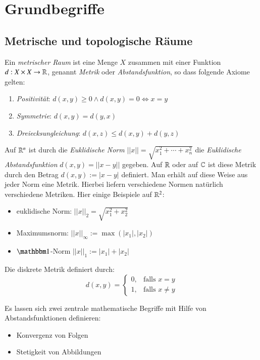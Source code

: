 \documentclass[a4paper,10pt]{scrartcl}
\renewcommand{\equiv}{\Longleftrightarrow}
\begin{document}
\section{Grundbegriffe}
\subsection{Metrische und topologische Räume}
\begin{df}
Ein \emph{metrischer Raum} ist eine Menge $X$ zusammen mit einer Funktion $d: X \times X \rightarrow \mathbb{R}$, genannt \emph{Metrik} oder \emph{Abstandsfunktion}, so dass folgende Axiome gelten:
\begin{enumerate}
\item \emph{Positivität}: $d(x,y)\ge 0 \land d(x,y)=0\equiv x=y$
\item \emph{Symmetrie}: $d(x,y)=d(y,x)$
\item \emph{Dreiecksungleichung}: $d(x,z) \le d(x,y)+d(y,z)$
\end{enumerate}
\end{df}
\begin{ex*}
Auf $\mathbb{R}^n$ ist durch die \emph{Euklidische Norm} $||x||=\sqrt{x_1^2+\dotsb +x_n^2}$ die \emph{Euklidische Abstandsfunktion} $d(x,y)=||x-y||$ gegeben. Auf $\mathbb{R}$ oder auf $\mathbb{C}$ ist diese Metrik durch den Betrag $d(x,y):=|x-y|$ definiert.  Man erhält auf diese Weise aus jeder Norm eine Metrik. Hierbei liefern verschiedene Normen natürlich verschiedene Metriken. Hier einige Beispiele auf $\mathbb{R}^2$:
\begin{itemize} 
\item euklidische Norm: $||x||_2=\sqrt{x_1^2+x_2^2}$
\item Maximumsnorm: $||x||_\infty := \max(|x_1|, |x_2|)$
\item $\Eins$-Norm $||x||_1 := |x_1|+|x_2|$
\end{itemize}
\end{ex*}

\begin{ex*}
Die diskrete Metrik definiert durch:
\[
d(x,y)=\begin{cases}
  0, & \text{falls } x=y \\ 1, & \text{falls } x\neq y
\end{cases}
\]
\end{ex*}

Es lassen sich zwei zentrale mathematische Begriffe mit Hilfe von Abstandsfunktionen definieren:
\begin{itemize}
\item Konvergenz von Folgen
\item Stetigkeit von Abbildungen
\end{itemize}
\end{document}
